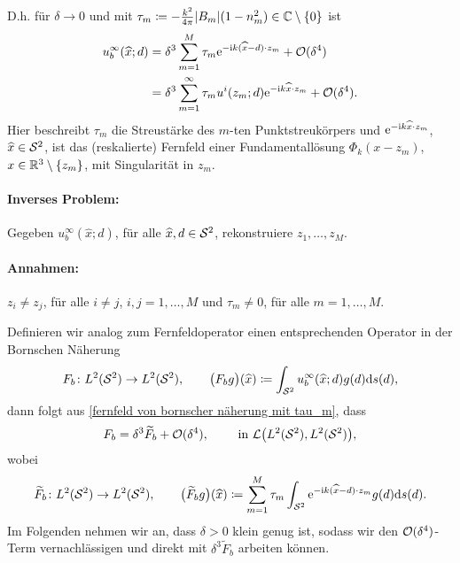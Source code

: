 D.h. für \(\delta\to0\) und mit \(\tau_m\coloneqq-\frac{k^2}{4\pi}|B_m|(1-n_m^2)\in\mathbb{C}\setminus\{0\}\) ist
\begin{equation}
	\label{fernfeld von bornscher näherung mit tau_m}
	\begin{aligned}
		u_b^\infty(\widehat{x};d)
		&=\delta^3\sum_{m=1}^M\tau_m\mathrm{e}^{-\mathrm{i} k(\widehat{x}-d)\cdot z_m}+\mathcal{O}(\delta^4)\\
		&=\delta^3\sum_{m=1}^\infty\tau_m u^i(z_m;d)\mathrm{e}^{-\mathrm{i} k\widehat{x}\cdot z_m}+\mathcal{O}(\delta^4).
	\end{aligned}
\end{equation}
Hier beschreibt \(\tau_m\) die Streustärke des \(m\)-ten Punktstreukörpers und \(\mathrm{e}^{-\mathrm{i} k\widehat{x}\cdot z_m}\), \(\widehat{x}\in\mathcal{S}^2\), ist das (reskalierte) Fernfeld einer Fundamentallösung \(\Phi_k(x-z_m)\), \(x\in\mathbb{R}^3\setminus\{z_m\}\), mit Singularität in \(z_m\).\vspace{2mm}

\paragraph{Inverses Problem:} Gegeben \(u_b^\infty(\widehat{x};d)\), für alle \(\widehat{x},d\in\mathcal{S}^2\), rekonstruiere \(z_1,\ldots,z_M\).

\paragraph{Annahmen:} \(z_i\neq z_j\), für alle \(i\neq j\), \(i,j=1,\ldots,M\) und \(\tau_m\neq0\), für alle \(m=1,\ldots,M\).

Definieren wir analog zum Fernfeldoperator einen entsprechenden Operator in der Bornschen Näherung
\begin{equation}
	\label{operator in bornscher näherung, analog zum fernfeldoperator}
	F_b\colon L^2(\mathcal{S}^2) \to L^2(\mathcal{S}^2),\qquad\big(F_bg\big)(\widehat{x})\coloneqq\int_{\mathcal{S}^2}u_b^\infty(\widehat{x};d)g(d)\mathrm{d}s(d),
\end{equation}
dann folgt aus \eqref{fernfeld von bornscher näherung mit tau_m}, dass
\begin{equation}
	\label{operator zur bornschen näherung aufgesplittet mit restterm}
	F_b=\delta^3\widetilde{F}_b+\mathcal{O}(\delta^4),\qquad\text{ in }\mathcal{L}\big(L^2(\mathcal{S}^2),L^2(\mathcal{S}^2)\big),
\end{equation}
wobei
\begin{equation}
	\label{definition von operator zur bornschen näherung aufgesplittet mit restterm}
	\widetilde{F}_b\colon L^2(\mathcal{S}^2) \to L^2(\mathcal{S}^2),\qquad\big(\widetilde{F}_bg\big)(\widehat{x})\coloneqq\sum_{m=1}^M\tau_m\int_{\mathcal{S}^2}\mathrm{e}^{-\mathrm{i} k(\widehat{x}-d)\cdot z_m}g(d)\mathrm{d}s(d).
\end{equation}
Im Folgenden nehmen wir an, dass \(\delta>0\) klein genug ist, sodass wir den \(\mathcal{O}(\delta^4)\)-Term vernachlässigen und direkt mit \(\delta^3\widetilde{F}_b\) arbeiten können. 

